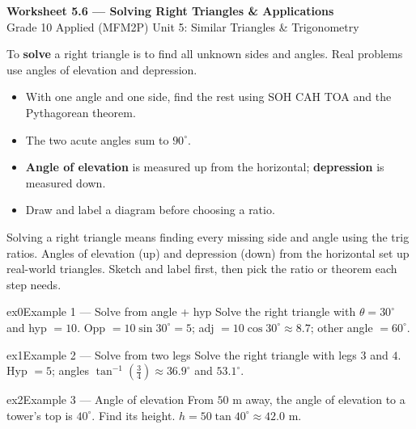\documentclass[11pt]{article}
\begin{document}
\begin{center}
{\LARGE\bfseries\color{titleblue}Worksheet 5.6 --- Solving Right Triangles \& Applications}\\[2pt]
{\small Grade 10 Applied (MFM2P) \textperiodcentered{} Unit 5: Similar Triangles \& Trigonometry}
\end{center}

\begin{ideabox}
To \textbf{solve} a right triangle is to find all unknown sides and angles. Real problems use angles of elevation and depression.
\begin{itemize}[leftmargin=*,itemsep=2pt]
  \item With one angle and one side, find the rest using SOH CAH TOA and the Pythagorean theorem.
  \item The two acute angles sum to $90^\circ$.
  \item \textbf{Angle of elevation} is measured up from the horizontal; \textbf{depression} is measured down.
  \item Draw and label a diagram before choosing a ratio.
\end{itemize}
\end{ideabox}

\begin{learnbox}
Solving a right triangle means finding every missing side and angle using the trig ratios.
Angles of elevation (up) and depression (down) from the horizontal set up real-world triangles.
Sketch and label first, then pick the ratio or theorem each step needs.
\end{learnbox}


\begin{example}{ex0}{Example 1 --- Solve from angle + hyp}
Solve the right triangle with $\theta=30^\circ$ and hyp $=10$.
\soln Opp $=10\sin30^\circ=5$; adj $=10\cos30^\circ\approx8.7$; other angle $=60^\circ.$
\end{example}

\begin{example}{ex1}{Example 2 --- Solve from two legs}
Solve the right triangle with legs $3$ and $4$.
\soln Hyp $=5$; angles $\tan^{-1}(\tfrac34)\approx36.9^\circ$ and $53.1^\circ.$
\end{example}

\begin{example}{ex2}{Example 3 --- Angle of elevation}
From $50$ m away, the angle of elevation to a tower's top is $40^\circ$. Find its height.
\soln $h=50\tan40^\circ\approx42.0$ m.
\end{example}
\end{document}
